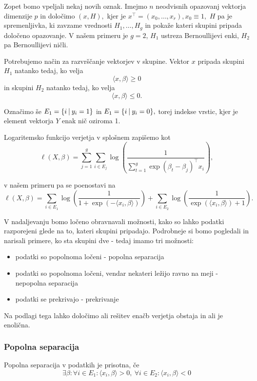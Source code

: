 \documentclass[12pt,a4paper]{amsart}
\theoremstyle{definition} %
\theoremstyle{plain} %
\begin{document}
Zopet bomo vpeljali nekaj novih oznak. Imejmo $n$ neodvisnih opazovanj vektorja dimenzije $p$ in določimo $(x,H),$ kjer je $x^\top = (x_{0},\ldots,x_{r}),x_{0}\equiv 1,$
$H$ pa je spremenljivka, ki zavzame vrednosti $H_{1},\ldots,H_{g}$ in pokaže kateri skupini pripada določeno opazovanje. V našem primeru je $g=2$, $H_{1}$ ustreza Bernoullijevi
enki, $H_{2}$ pa Bernoullijevi ničli.


Potrebujemo način za razvrščanje vektorjev v skupine. Vektor $x$ pripada skupini $H_{1}$ natanko tedaj, ko velja
\[
    \langle x,\beta \rangle \geq 0
\]
in skupini $H_{2}$ natanko tedaj, ko velja
\[
    \langle x,\beta \rangle \leq 0.
\]

Označimo še $E_{1} = \{i~\vline~y_{i} = 1\}$ in $E_{1} = \{i~\vline~y_{i} = 0\},$ torej indekse vrstic, kjer je element vektorja $Y$ enak nič oziroma 1.

Logaritemsko funkcijo verjetja v splošnem zapišemo kot
\[
    \ell(X,\beta) = \sum_{j=1}^{g}\sum_{i\in E_{j}}\log\left(\frac{1}{\sum_{t=1}^{g} \exp(\beta_{t}-\beta_{j})^\top x_{i}}\right),
\]

v našem primeru pa se poenostavi na
\begin{equation*}
\ell(X,\beta) = \sum_{i\in E_{1}} \log\left(\frac{1}{1+\exp(-\langle x_{i},\beta \rangle)}\right) + \sum_{i\in E_{2}}\log\left(\frac{1}{\exp(\langle x_{i},\beta \rangle) + 1}\right).
\end{equation*}

V nadaljevanju bomo ločeno obravnavali možnosti, kako so lahko podatki razporejeni glede na to, kateri skupini pripadajo. Podrobneje si bomo pogledali in narisali
primere, ko sta skupini dve - tedaj imamo tri možnosti:
\begin{itemize}
    \item podatki so popolnoma ločeni - popolna separacija
    \item podatki so popolnoma ločeni, vendar nekateri ležijo ravno na meji - nepopolna separacija
    \item podatki se prekrivajo - prekrivanje
\end{itemize}
Na podlagi tega lahko določimo ali rešitev enačb verjetja obstaja in ali je enolična.

\subsubsection{Popolna separacija}
Popolna separacija v podatkih je prisotna, če 
\[
    \exists \beta: \forall i \in E_{1}: \langle x_{i},\beta \rangle > 0,~
    \forall i \in E_{2}: \langle x_{i},\beta \rangle < 0
\]
\end{document}
